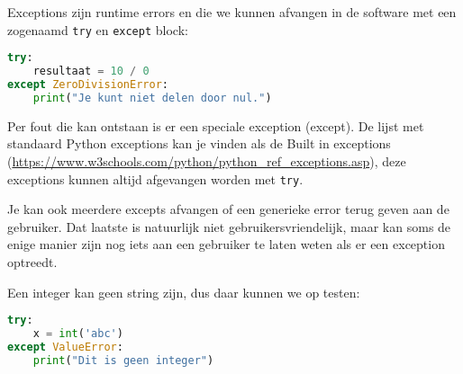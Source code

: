 Exceptions zijn runtime errors en die we kunnen afvangen in de software met een zogenaamd \texttt{try} en \texttt{except} block:
\begin{lstlisting}[language=python]
try:
    resultaat = 10 / 0
except ZeroDivisionError:
    print("Je kunt niet delen door nul.")
\end{lstlisting}

Per fout die kan ontstaan is er een speciale exception (except). De lijst met standaard Python exceptions kan je vinden als de Built in exceptions (\url{https://www.w3schools.com/python/python_ref_exceptions.asp}), deze exceptions kunnen altijd afgevangen worden met \texttt{try}.

Je kan ook meerdere excepts afvangen of een generieke error terug geven aan de gebruiker. Dat laatste is natuurlijk niet gebruikersvriendelijk, maar kan soms de enige manier zijn nog iets aan een gebruiker te laten weten als er een exception optreedt.

Een integer kan geen string zijn, dus daar kunnen we op testen:
\begin{lstlisting}[language=python]
try:
    x = int('abc')
except ValueError:
    print("Dit is geen integer")
\end{lstlisting}


